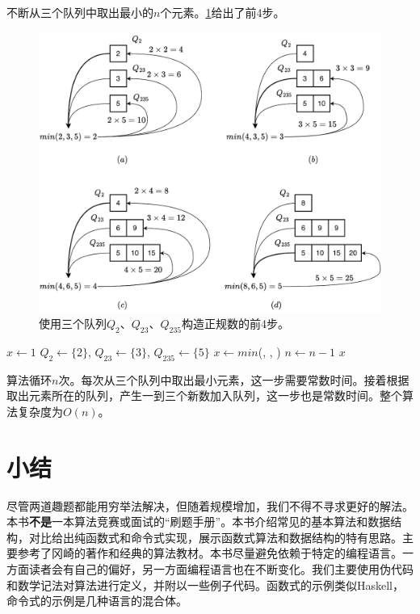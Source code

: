 \documentclass[b5paper, punct=kaiming]{ctexart}
\begin{document}
不断从三个队列中取出最小的$n$个元素。\cref{fig:q235}给出了前4步。

\begin{figure}[htbp]
  \centering
  \includegraphics[scale=0.5]{img/q235}
  \caption{使用三个队列$Q_2$、$Q_{23}$、$Q_{235}$构造正规数的前4步。}
  \label{fig:q235}
\end{figure}

\begin{algorithmic}[1]
  \State $x \gets 1$
  \State $Q_2 \gets \{ 2 \}$, $Q_{23} \gets \{ 3 \}$, $Q_{235} \gets \{ 5 \}$
    \State $x \gets min$(, , )
      \State {}
      \State {}
      \State {}
      \State {}
      \State {}
      \State {}
      \State {}
    \Else
      \State {}
      \State {}
    \EndIf
    \State $n \gets n - 1$
  \EndWhile
  \State \Return $x$
\EndFunction
\end{algorithmic}

算法循环$n$次。每次从三个队列中取出最小元素，这一步需要常数时间。接着根据取出元素所在的队列，产生一到三个新数加入队列，这一步也是常数时间。整个算法复杂度为$O(n)$。

\section*{小结}
尽管两道趣题都能用穷举法解决，但随着规模增加，我们不得不寻求更好的解法。本书\textbf{不是}一本算法竞赛或面试的“刷题手册”。本书介绍常见的基本算法和数据结构，对比给出纯函数式和命令式实现，展示函数式算法和数据结构的特有思路。主要参考了冈崎的著作\cite{okasaki-book}和经典的算法教材\cite{CLRS}。本书尽量避免依赖于特定的编程语言。一方面读者会有自己的偏好，另一方面编程语言也在不断变化。我们主要使用伪代码和数学记法对算法进行定义，并附以一些例子代码。函数式的示例类似Haskell，命令式的示例是几种语言的混合体。
\end{document}
